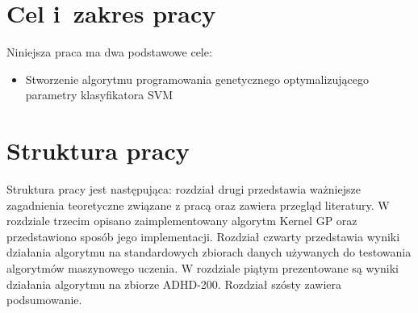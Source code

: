 \section{Cel i~zakres pracy}
Niniejsza praca ma dwa podstawowe cele:
\begin{itemize}
\item Stworzenie algorytmu programowania genetycznego optymalizującego parametry klasyfikatora SVM
\end{itemize}

\section{Struktura pracy}
Struktura pracy jest następująca: rozdział drugi przedstawia ważniejsze zagadnienia teoretyczne związane z pracą oraz zawiera przegląd literatury. W rozdziale trzecim opisano zaimplementowany algorytm Kernel GP oraz przedstawiono sposób jego implementacji. Rozdział czwarty przedstawia wyniki działania algorytmu na standardowych zbiorach danych używanych do testowania algorytmów maszynowego uczenia. W rozdziale piątym prezentowane są wyniki działania algorytmu na zbiorze ADHD-200. Rozdział szósty zawiera podsumowanie.



